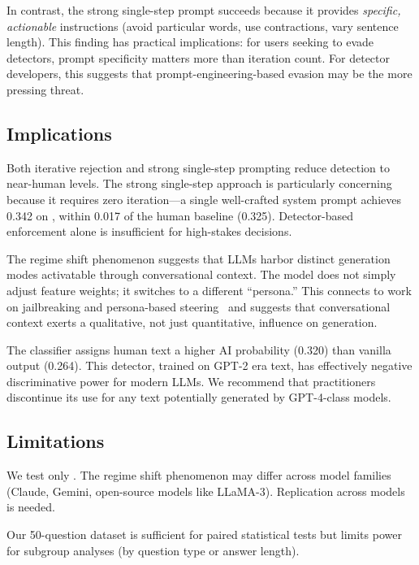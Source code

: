 In contrast, the strong single-step prompt succeeds because it provides \emph{specific, actionable} instructions (avoid particular words, use contractions, vary sentence length). This finding has practical implications: for users seeking to evade detectors, prompt specificity matters more than iteration count. For detector developers, this suggests that prompt-engineering-based evasion may be the more pressing threat.

\subsection{Implications}

Both iterative rejection and strong single-step prompting reduce detection to near-human levels. The strong single-step approach is particularly concerning because it requires zero iteration---a single well-crafted system prompt achieves 0.342 on \binoculars, within 0.017 of the human baseline (0.325). Detector-based enforcement alone is insufficient for high-stakes decisions.

The regime shift phenomenon suggests that LLMs harbor distinct generation modes activatable through conversational context. The model does not simply adjust feature weights; it switches to a different ``persona.'' This connects to work on jailbreaking and persona-based steering~\cite{madaan2023selfrefine} and suggests that conversational context exerts a qualitative, not just quantitative, influence on generation.

The \roberta classifier assigns human text a higher AI probability (0.320) than vanilla \gptfour output (0.264). This detector, trained on GPT-2 era text, has effectively negative discriminative power for modern LLMs. We recommend that practitioners discontinue its use for any text potentially generated by GPT-4-class models.

\subsection{Limitations}
\label{sec:limitations}

We test only \gptfour. The regime shift phenomenon may differ across model families (Claude, Gemini, open-source models like LLaMA-3). Replication across models is needed.

Our 50-question dataset is sufficient for paired statistical tests but limits power for subgroup analyses (\eg by question type or answer length).

